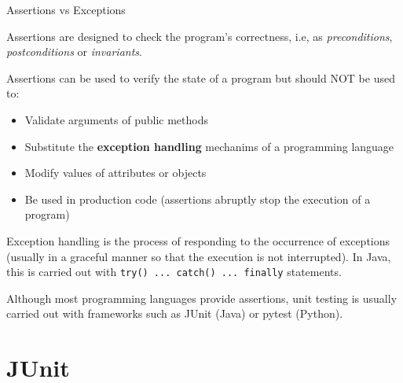 \documentclass[11pt, xcolor=svgnames]{beamer}
\begin{document}
\begin{frame}[fragile]{Assertions vs Exceptions}

Assertions are designed to check the program's correctness, i.e, as \emph{preconditions}, \emph{postconditions} or \emph{invariants}.

Assertions can be used to verify the state of a program but should NOT be used to:

\begin{itemize}
\item Validate arguments of public methods
\item Substitute the \textbf{exception handling} mechanims of a programming language
\item Modify values of attributes or objects
\item Be used in production code (assertions abruptly stop the execution of a program)
\end{itemize}

Exception handling is the process of responding to the occurrence of exceptions (usually in a graceful manner so that the execution is not interrupted). In Java, this is carried out with \texttt{try() ... catch() ... finally} statements.

Although most programming languages provide assertions, unit testing is usually carried out with frameworks such as JUnit (Java) or pytest (Python). 

\end{frame}



\section{JUnit}

\end{document}
